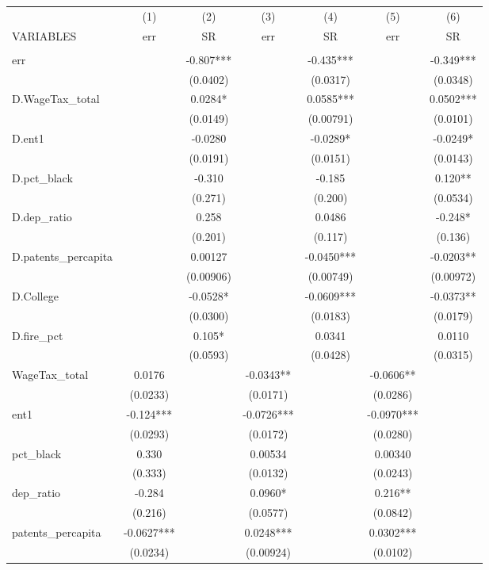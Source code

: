 \begin{tabular}{lcccccc} \hline
 & (1) & (2) & (3) & (4) & (5) & (6) \\
VARIABLES & err & SR & err & SR & err & SR \\ \hline
 &  &  &  &  &  &  \\
err &  & -0.807*** &  & -0.435*** &  & -0.349*** \\
 &  & (0.0402) &  & (0.0317) &  & (0.0348) \\
D.WageTax\_total &  & 0.0284* &  & 0.0585*** &  & 0.0502*** \\
 &  & (0.0149) &  & (0.00791) &  & (0.0101) \\
D.ent1 &  & -0.0280 &  & -0.0289* &  & -0.0249* \\
 &  & (0.0191) &  & (0.0151) &  & (0.0143) \\
D.pct\_black &  & -0.310 &  & -0.185 &  & 0.120** \\
 &  & (0.271) &  & (0.200) &  & (0.0534) \\
D.dep\_ratio &  & 0.258 &  & 0.0486 &  & -0.248* \\
 &  & (0.201) &  & (0.117) &  & (0.136) \\
D.patents\_percapita &  & 0.00127 &  & -0.0450*** &  & -0.0203** \\
 &  & (0.00906) &  & (0.00749) &  & (0.00972) \\
D.College &  & -0.0528* &  & -0.0609*** &  & -0.0373** \\
 &  & (0.0300) &  & (0.0183) &  & (0.0179) \\
D.fire\_pct &  & 0.105* &  & 0.0341 &  & 0.0110 \\
 &  & (0.0593) &  & (0.0428) &  & (0.0315) \\
WageTax\_total & 0.0176 &  & -0.0343** &  & -0.0606** &  \\
 & (0.0233) &  & (0.0171) &  & (0.0286) &  \\
ent1 & -0.124*** &  & -0.0726*** &  & -0.0970*** &  \\
 & (0.0293) &  & (0.0172) &  & (0.0280) &  \\
pct\_black & 0.330 &  & 0.00534 &  & 0.00340 &  \\
 & (0.333) &  & (0.0132) &  & (0.0243) &  \\
dep\_ratio & -0.284 &  & 0.0960* &  & 0.216** &  \\
 & (0.216) &  & (0.0577) &  & (0.0842) &  \\
patents\_percapita & -0.0627*** &  & 0.0248*** &  & 0.0302*** &  \\
 & (0.0234) &  & (0.00924) &  & (0.0102) &  \\

\end{tabular}
